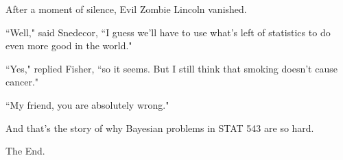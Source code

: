 \documentclass{article}
\begin{document}
After a moment of silence, Evil Zombie Lincoln vanished. \newline

``Well," said Snedecor, ``I guess we'll have to use what's left of statistics to do even more good in the world." \newline

``Yes," replied Fisher, ``so it seems. But I still think that smoking doesn't cause cancer." \newline

``My friend, you are absolutely wrong." \newline

And that's the story of why Bayesian problems in STAT 543 are so hard. \newline

\begin{center}
The End.
\end{center}
\end{document}
